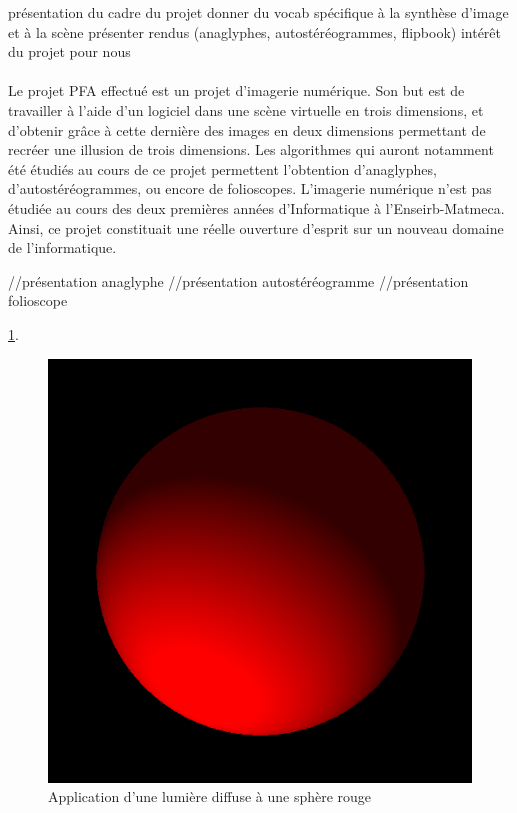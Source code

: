 présentation du cadre du projet
donner du vocab spécifique à la synthèse d'image et à la scène
présenter rendus (anaglyphes, autostéréogrammes, flipbook)
intérêt du projet pour nous

\paragraph{}
        Le projet PFA effectué est un projet d'imagerie numérique. Son but est de travailler à l'aide d'un logiciel dans une scène virtuelle en trois dimensions, et d'obtenir grâce à cette dernière des images en deux dimensions permettant de recréer une illusion de trois dimensions. Les algorithmes qui auront notamment été étudiés au cours de ce projet permettent l'obtention d'anaglyphes, d'autostéréogrammes, ou encore de folioscopes.
        L'imagerie numérique n'est pas étudiée au cours des deux premières années d'Informatique à l'Enseirb-Matmeca. Ainsi, ce projet constituait une réelle ouverture d'esprit sur un nouveau domaine de l'informatique.
        

//présentation anaglyphe
//présentation autostéréogramme
//présentation folioscope




\ref{fig:sphère}.

\begin{figure}[h]
	\centering
	\includegraphics[scale=0.3]{boule.png}
	\caption{\label{fig:sphère} Application d’une lumière diffuse à une sphère rouge \protect \footnotemark }
\end{figure}


